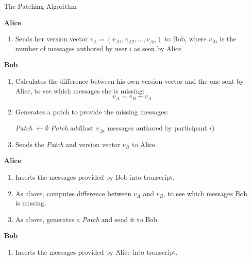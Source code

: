 \documentclass[a4paper, twoside, 12pt]{report}
\begin{document}
\begin{algorithm}
\caption{The Patching Algorithm}
\label{alg:patching}
{\bfseries Alice}
\begin{enumerate}[topsep=1pt, itemsep=1pt]
    \item Sends her version vector $v_A = (v_{A1}, v_{A2}, ..., v_{An})$ to Bob, where $v_{Ai}$ is the number of messages authored by user $i$ as seen by Alice \\
\end{enumerate}
\vspace{-2pt}
{\bfseries Bob}
\begin{enumerate}[topsep=1pt, itemsep=1pt]
    \item Calculates the difference between his own version vector and the one sent by Alice, to see which messages she is missing:
        \begin{equation*}
            v_{\Delta} = v_B - v_A
        \end{equation*}
    \item {Generates a patch to provide the missing messages: \newline \vspace{-5mm}}
        \begin{algorithmic}
            \STATE \textit{Patch} $\leftarrow \emptyset$
                    \STATE \textit{Patch.add}(last $v_{\Delta i}$ messages authored by participant $i$)                        
                \ENDIF
            \ENDFOR
        \end{algorithmic}
    \item Sends the \textit{Patch} and version vector $v_B$ to Alice. \\
\end{enumerate}
\vspace{-2pt}
{\bfseries Alice}
\begin{enumerate}[topsep=1pt, itemsep=1pt]
    \item Inserts the messages provided by Bob into transcript.
    \item As above, computes difference between $v_A$ and $v_B$, to see which messages Bob is missing.
    \item As above, generates a \textit{Patch} and send it to Bob. \\
\end{enumerate}
\vspace{-2pt}
{\bfseries Bob}
\begin{enumerate}[topsep=1pt, itemsep=1pt]
    \item Inserts the messages provided by Alice into transcript.
\end{enumerate}
\end{algorithm}
\end{document}
